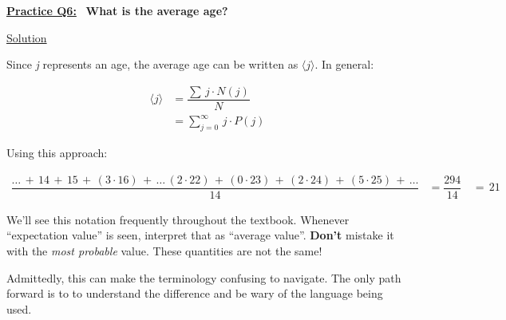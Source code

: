 \underline{\textbf{Practice Q6:}} \ \textbf{What is the average age?}

\bigskip

\underline{Solution}

Since \textit{j} represents an age, the average age can be written as
$\langle j \rangle$. In general:

\begin{align*}
    \langle j \rangle &= \dfrac{\sum \, j \cdot N(j)}{N} \\[1.5ex]
    &= \sum_{j=0}^{\infty} \, j \cdot P(j)
\end{align*}

\newpage

Using this approach:

\begin{align*}
    \dfrac{\dots \, + \, 14 \, + \, 15 \, + \, (3 \cdot 16) \, + \, \dots \,
    (2 \cdot 22) \, + \, (0 \cdot 23) \, + \, (2 \cdot 24) \, + \,
    (5 \cdot 25) \, + \, \dots}{14} &= \dfrac{294}{14}
    \, &= \, \boxed{21}
\end{align*}

\bigskip

We'll see this notation frequently throughout the textbook. Whenever ``expectation value'' is seen, interpret that as
``average value''. \textbf{Don't} mistake it with the \textit{most probable} value. These quantities are not the same!


Admittedly, this can make the terminology confusing to navigate. The only path forward is to to understand the
difference and be wary of the language being used.